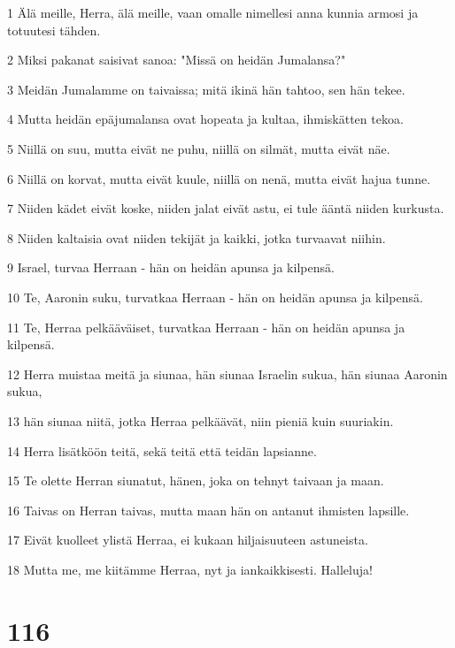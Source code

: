 \par 1 Älä meille, Herra, älä meille, vaan omalle nimellesi anna kunnia armosi ja totuutesi tähden.
\par 2 Miksi pakanat saisivat sanoa: "Missä on heidän Jumalansa?"
\par 3 Meidän Jumalamme on taivaissa; mitä ikinä hän tahtoo, sen hän tekee.
\par 4 Mutta heidän epäjumalansa ovat hopeata ja kultaa, ihmiskätten tekoa.
\par 5 Niillä on suu, mutta eivät ne puhu, niillä on silmät, mutta eivät näe.
\par 6 Niillä on korvat, mutta eivät kuule, niillä on nenä, mutta eivät hajua tunne.
\par 7 Niiden kädet eivät koske, niiden jalat eivät astu, ei tule ääntä niiden kurkusta.
\par 8 Niiden kaltaisia ovat niiden tekijät ja kaikki, jotka turvaavat niihin.
\par 9 Israel, turvaa Herraan - hän on heidän apunsa ja kilpensä.
\par 10 Te, Aaronin suku, turvatkaa Herraan - hän on heidän apunsa ja kilpensä.
\par 11 Te, Herraa pelkääväiset, turvatkaa Herraan - hän on heidän apunsa ja kilpensä.
\par 12 Herra muistaa meitä ja siunaa, hän siunaa Israelin sukua, hän siunaa Aaronin sukua,
\par 13 hän siunaa niitä, jotka Herraa pelkäävät, niin pieniä kuin suuriakin.
\par 14 Herra lisätköön teitä, sekä teitä että teidän lapsianne.
\par 15 Te olette Herran siunatut, hänen, joka on tehnyt taivaan ja maan.
\par 16 Taivas on Herran taivas, mutta maan hän on antanut ihmisten lapsille.
\par 17 Eivät kuolleet ylistä Herraa, ei kukaan hiljaisuuteen astuneista.
\par 18 Mutta me, me kiitämme Herraa, nyt ja iankaikkisesti. Halleluja!

\chapter{116}

